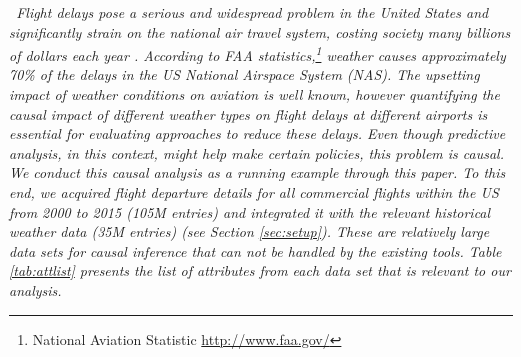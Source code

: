 \vspace{-.2cm}
\begin{example} \em \delay \
Flight delays pose a serious and widespread problem in the United States and
significantly strain on the national air travel system,
costing society many billions of dollars each year \cite{ball2010total}.
According to FAA statistics,\footnote{National Aviation Statistic \url{http://www.faa.gov/}}
weather causes approximately 70\% of the delays in the US National Airspace System (NAS).
The upsetting impact of weather conditions on aviation is well known,
however quantifying the causal impact of different weather types on flight delays at different airports
is essential for evaluating approaches to reduce these delays.
Even though predictive analysis, in this context, might help make certain policies, this problem is causal.
We conduct this causal analysis as a running example through this paper.
To this end, we acquired flight departure details for all commercial flights within the US from 2000 to 2015 (105M entries)
and integrated it with the relevant historical weather data (35M entries) (see Section \ref{sec:setup}).
These are relatively large data sets for causal inference that can not be handled by the existing tools.
Table \ref{tab:attlist} presents the list of attributes from each data set that is relevant to our analysis.




\end{example}

